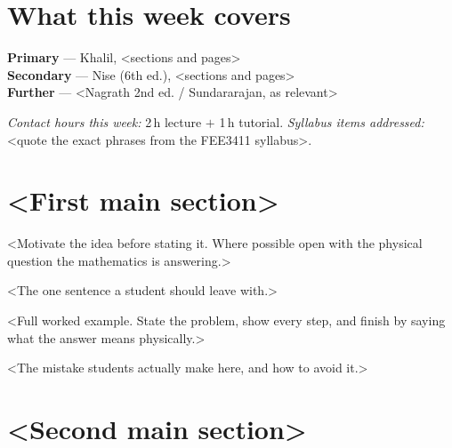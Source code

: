 \documentclass[11pt,a4paper]{article}
\begin{document}
\weektitle

\section*{What this week covers}

\begin{outcomes}
\item <outcome 1 -- phrased as something the student can do>
\item <outcome 2>
\item <outcome 3>
\end{outcomes}

\begin{readingbox}
\textbf{Primary} --- Khalil, <sections and pages>\\
\textbf{Secondary} --- Nise (6th ed.), <sections and pages>\\
\textbf{Further} --- <Nagrath 2nd ed. / Sundararajan, as relevant>
\end{readingbox}

\noindent
\emph{Contact hours this week:} 2\,h lecture $+$ 1\,h tutorial.
\emph{Syllabus items addressed:} <quote the exact phrases from the FEE3411 syllabus>.

\section{<First main section>}

<Motivate the idea before stating it. Where possible open with the physical
question the mathematics is answering.>

\begin{keyidea}
<The one sentence a student should leave with.>
\end{keyidea}

\begin{workedex}[title=Worked example \thesection.1]
<Full worked example. State the problem, show every step, and finish by
saying what the answer means physically.>
\end{workedex}

\begin{pitfall}
<The mistake students actually make here, and how to avoid it.>
\end{pitfall}

\section{<Second main section>}
\end{document}
